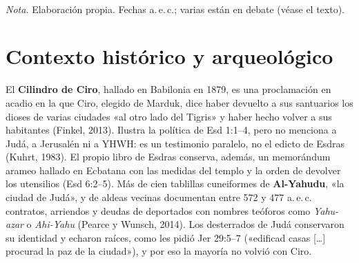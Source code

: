\begin{center}
\\[2pt]
{\footnotesize\color{sepia}\textit{Nota.} Elaboración propia. Fechas a.\,e.\,c.; varias están en debate (véase el texto).}
\end{center}

\section{Contexto histórico y arqueológico}

El \textbf{Cilindro de Ciro}, hallado en Babilonia en 1879, es una proclamación en acadio en la que Ciro, elegido de Marduk, dice haber devuelto a sus santuarios los dioses de varias ciudades «al otro lado del Tigris» y haber hecho volver a sus habitantes (Finkel, 2013). Ilustra la política de Esd 1:1--4, pero no menciona a Judá, a Jerusalén ni a YHWH: es un testimonio paralelo, no el edicto de Esdras (Kuhrt, 1983). El propio libro de Esdras conserva, además, un memorándum arameo hallado en Ecbatana con las medidas del templo y la orden de devolver los utensilios (Esd 6:2--5). Más de cien tablillas cuneiformes de \textbf{Al-Yahudu}, «la ciudad de Judá», y de aldeas vecinas documentan entre 572 y 477 a.\,e.\,c. contratos, arriendos y deudas de deportados con nombres teóforos como \emph{Yahu-azar} o \emph{Ahi-Yahu} (Pearce y Wunsch, 2014). Los desterrados de Judá conservaron su identidad y echaron raíces, como les pidió Jer 29:5--7 («edificad casas [\ldots] procurad la paz de la ciudad»), y por eso la mayoría no volvió con Ciro.

